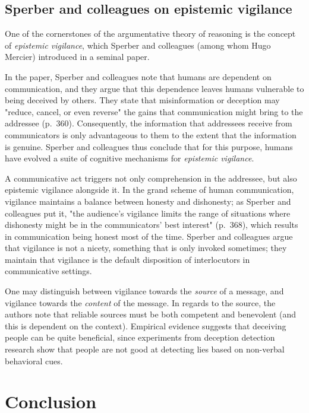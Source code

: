 \subsection{Sperber and colleagues on epistemic vigilance}


One of the cornerstones of the argumentative theory of reasoning is the concept of \emph{epistemic vigilance}, which Sperber and colleagues (among whom Hugo Mercier) introduced in a seminal \citeyear{Sperber10} paper.

In the paper, Sperber and colleagues note that humans are dependent on communication, and they argue that this dependence leaves humans vulnerable to being deceived by others.
They state that misinformation or deception may "reduce, cancel, or even reverse" the gains that communication might bring to the addressee (p.~360).
Consequently, the information that addressees receive from communicators is only advantageous to them to the extent that the information is genuine.
Sperber and colleagues thus conclude that for this purpose, humans have evolved a suite of cognitive mechanisms for \emph{epistemic vigilance}.

A communicative act triggers not only comprehension in the addressee, but also epistemic vigilance alongside it.
In the grand scheme of human communication, vigilance maintains a balance between honesty and dishonesty; as Sperber and colleagues put it, "the audience's vigilance limits the range of situations where dishonesty might be in the communicators' best interest" (p.~368), which results in communication being honest most of the time.
Sperber and colleagues argue that vigilance is not a nicety, something that is only invoked sometimes; they maintain that vigilance is the default disposition of interlocutors in communicative settings.

One may distinguish between vigilance towards the \emph{source} of a message, and vigilance towards the \emph{content} of the message.
In regards to the source, the authors note that reliable sources must be both competent and benevolent (and this is dependent on the context).
Empirical evidence suggests that deceiving people can be quite beneficial, since experiments from deception detection research show that people are not good at detecting lies based on non-verbal behavioral cues.

\section{Conclusion}
